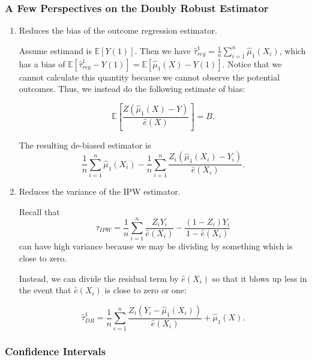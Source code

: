 \subsubsection{A Few Perspectives on the Doubly Robust Estimator}

\begin{enumerate}
    \item Reduces the bias of the outcome regression estimator.

    Assume estimand is $\mathbb{E}[Y(1)]$. Then we have $\hat{\tau}_{reg}^1=\frac{1}{n}\sum_{i=1}^n\hat{\mu}_1(X_i)$, which has a bias of $\mathbb{E}\left[\hat{\tau}^1_{reg}-Y(1)\right]=\mathbb{E}\left[\hat{\mu}_1(X)-Y(1)\right]$. Notice that we cannot calculate this quantity because we cannot observe the potential outcomes. Thus, we instead do the following estimate of bias:

    \[\mathbb{E}\left[\frac{Z(\hat{\mu}_1(X)-Y)}{\hat{e}(X)}\right]=B.\]

    The resulting de-biased estimator is \[\frac{1}{n}\sum\limits_{i=1}^n\hat{\mu}_1(X_i)-\frac{1}{n}\sum\limits_{i=1}^n\frac{Z_i(\hat{\mu}_1(X_i)-Y_i)}{\hat{e}(X_i)}.\]

    \item Reduces the variance of the IPW estimator.

    Recall that \[\tau_{IPW}=\frac{1}{n}\sum\limits_{i=1}^n\frac{Z_iY_i}{\hat{e}(X_i)}-\frac{(1-Z_i)Y_i}{1-\hat{e}(X_i)}\] can have high variance because we may be dividing by something which is close to zero.

    Instead, we can divide the residual term by $\hat{e}(X_i)$ so that it blows up less in the event that $\hat{e}(X_i)$ is close to zero or one:

    \[\hat{\tau}^1_{DR}=\frac{1}{n}\sum\limits_{i=1}^n\frac{Z_i(Y_i-\hat{\mu}_1(X_i))}{\hat{e}(X_i)}+\hat{\mu}_1(X).\]
\end{enumerate}

\subsubsection{Confidence Intervals}

